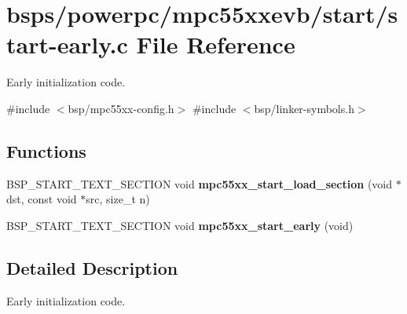 \hypertarget{start-early_8c}{}\section{bsps/powerpc/mpc55xxevb/start/start-\/early.c File Reference}
\label{start-early_8c}


Early initialization code.  


{\ttfamily \#include $<$bsp/mpc55xx-\/config.\+h$>$}\newline
{\ttfamily \#include $<$bsp/linker-\/symbols.\+h$>$}\newline
\subsection*{Functions}
\begin{DoxyCompactItemize}
\item 
\mbox{\label{start-early_8c_a079f67572b9b9d101f1059bf9bb18a81}} 
B\+S\+P\+\_\+\+S\+T\+A\+R\+T\+\_\+\+T\+E\+X\+T\+\_\+\+S\+E\+C\+T\+I\+ON void {\bfseries mpc55xx\+\_\+start\+\_\+load\+\_\+section} (void $\ast$dst, const void $\ast$src, size\+\_\+t n)
\item 
\mbox{\label{start-early_8c_acbc5f86a6a686aebbfc2673a6836424b}} 
B\+S\+P\+\_\+\+S\+T\+A\+R\+T\+\_\+\+T\+E\+X\+T\+\_\+\+S\+E\+C\+T\+I\+ON void {\bfseries mpc55xx\+\_\+start\+\_\+early} (void)
\end{DoxyCompactItemize}


\subsection{Detailed Description}
Early initialization code. 

